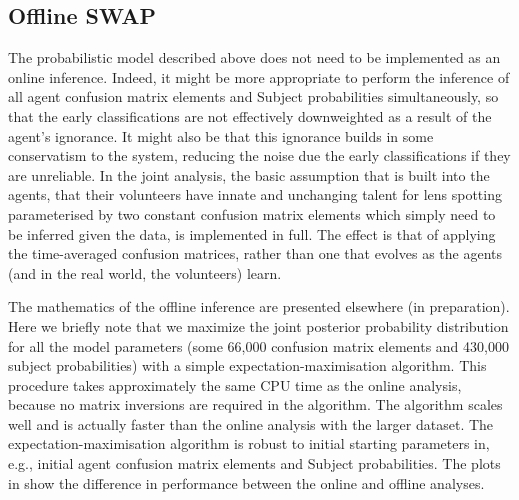 \documentclass[useAMS,usenatbib,a4paper]{mn2e}
\begin{document}


\subsection{Offline SWAP}
\label{appendix:swap:offline}

The probabilistic model described above does not need to be implemented as an
online inference. Indeed, it might be more appropriate to perform the inference
of all agent confusion matrix elements and Subject probabilities
simultaneously, so that the early classifications are not effectively
downweighted as a result of the agent's ignorance. It might also be that this
ignorance builds in some conservatism to the system, reducing the noise due
the early classifications if they are unreliable. In the joint analysis, the
basic assumption that is built into the agents, that their volunteers
have innate and unchanging talent for lens spotting parameterised by two
constant confusion matrix elements which simply need to be inferred given the
data, is implemented in full. The effect is that of applying the time-averaged
confusion matrices, rather than one that evolves as the agents (and in the
real world, the volunteers) learn.

The mathematics of the offline inference are presented elsewhere (in
preparation). Here we briefly note that we maximize the joint posterior
probability distribution for all the model parameters (some 66,000 confusion
matrix elements and 430,000 subject probabilities) with a simple
expectation-maximisation algorithm. This procedure takes approximately the
same CPU time as the \StageTwo online analysis, because no matrix inversions are
required in the algorithm. The algorithm scales well and is actually faster
than the online analysis with the larger \StageOne dataset. The
expectation-maximisation algorithm is robust to initial starting parameters
in, e.g., initial agent confusion matrix elements and Subject probabilities.
The plots in  show the difference in performance
between the online and offline analyses.
\end{document}
